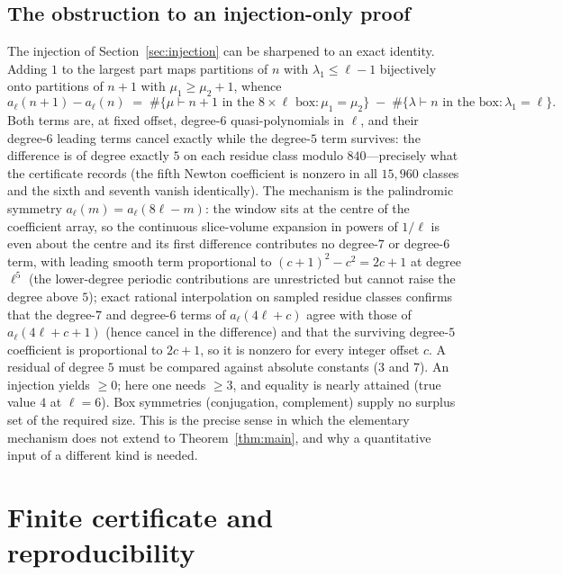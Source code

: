 \documentclass[11pt]{article}
\theoremstyle{definition}
\begin{document}
\subsection{The obstruction to an injection-only proof}\label{sec:obstruction}
The injection of Section~\ref{sec:injection} can be sharpened to an exact identity. Adding $1$ to
the largest part maps partitions of $n$ with $\lambda_1\le\ell-1$ bijectively onto partitions of
$n+1$ with $\mu_1\ge\mu_2+1$, whence
\[
  a_\ell(n+1)-a_\ell(n)
  \;=\;\#\{\mu\vdash n+1 \text{ in the } 8\times\ell \text{ box}: \mu_1=\mu_2\}
   \;-\;\#\{\lambda\vdash n \text{ in the box}: \lambda_1=\ell\}.
\]
Both terms are, at fixed offset, degree-$6$ quasi-polynomials in $\ell$, and their degree-$6$
leading terms cancel exactly while the degree-$5$ term survives: the difference is of degree
exactly $5$ on each residue class modulo $840$---precisely what the certificate records (the fifth
Newton coefficient is nonzero in all $15{,}960$ classes and the sixth and seventh vanish
identically). The mechanism is the palindromic symmetry $a_\ell(m)=a_\ell(8\ell-m)$: the window
sits at the centre of the coefficient array, so the continuous slice-volume expansion in powers
of $1/\ell$ is even about the centre and its first difference contributes no degree-$7$ or
degree-$6$ term, with leading smooth term proportional to $(c+1)^2-c^2=2c+1$ at degree $\ell^5$
(the lower-degree periodic contributions are unrestricted but cannot raise the degree above $5$);
exact rational interpolation on sampled residue classes confirms that the
degree-$7$ and degree-$6$ terms of $a_\ell(4\ell+c)$ agree with those of $a_\ell(4\ell+c+1)$
(hence cancel in the difference) and that the surviving degree-$5$ coefficient is proportional to
$2c+1$, so it is nonzero for every integer offset $c$. A residual of degree $5$ must be compared
against absolute constants ($3$ and $7$). An injection yields $\ge0$; here one needs $\ge3$, and equality is nearly attained
(true value $4$ at $\ell=6$). Box symmetries (conjugation, complement) supply no surplus set of the
required size. This is the precise sense in which the elementary mechanism does not extend to
Theorem~\ref{thm:main}, and why a quantitative input of a different kind is needed.

\section{Finite certificate and reproducibility}\label{sec:repro}
\end{document}
